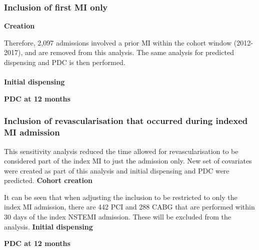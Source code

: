 \documentclass[11pt]{article}
\begin{document}
\subsubsection{Inclusion of first MI only}
\textbf{Creation}
\color{violet}
\begin{stlog}\end{stlog}
\color{black}
Therefore, 2,097 admissions involved a prior MI within the cohort window (2012-2017), and are removed from this analysis. The same analysis for predicted dispensing and PDC is then performed. \\~\\
\textbf{Initial dispensing}
\color{violet}
\begin{stlog}\end{stlog}
\color{black}
\textbf{PDC at 12 months}
\color{violet}
\begin{stlog}\end{stlog}
\color{black}
\subsubsection{Inclusion of revascularisation that occurred during indexed MI admission}
This sensitivity analysis reduced the time allowed for revascularisation to be considered part of the index MI to just the admission only. New set of covariates were created as part of this analysis and initial dispensing and PDC were predicted. 
\textbf{Cohort creation}
\color{violet}
\begin{stlog}\end{stlog}
\color{black}
It can be seen that when adjusting the inclusion to be restricted to only the index MI admission, there are 442 PCI and 288 CABG that are performed within 30 days of the index NSTEMI admission. These will be excluded from the analysis. 
\textbf{Initial dispensing}
\color{violet}
\begin{stlog}\end{stlog}
\color{black}
\textbf{PDC at 12 months}
\color{violet}
\begin{stlog}\end{stlog}
\color{black}
\end{document}
